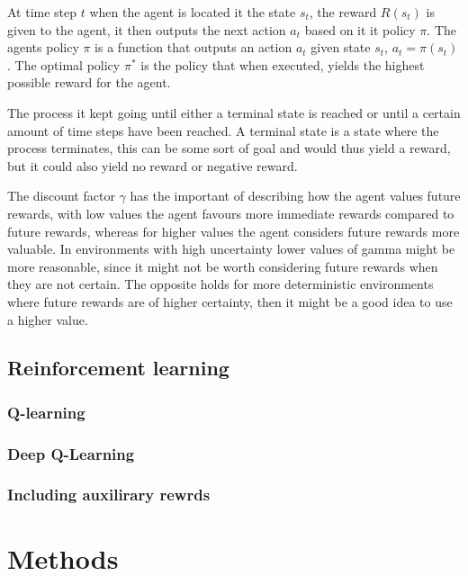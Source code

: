 \documentclass[12pt,A4]{report}
\theoremstyle{definition}
\begin{document}
At time step $t$ when the agent is located it the state $s_t$, the reward $R(s_t)$ is given to the agent, it then outputs the next action $a_t$ based on it it policy $\pi$. The agents policy $\pi$ is a function that outputs an action $a_t$ given state $s_t$, $a_t = \pi(s_t)$. The optimal policy $\pi^*$ is the policy that when executed, yields the highest possible reward for the agent. 

The process it kept going until either a terminal state is reached or until a certain amount of time steps have been reached. A terminal state is a state where the process terminates, this can be some sort of goal and would thus yield a reward, but it could also yield no reward or negative reward.

The discount factor $\gamma$ has the important of describing how the agent values future rewards, with low values the agent favours more immediate rewards compared to future rewards, whereas for higher values the agent considers future rewards more valuable. In environments with high uncertainty lower values of gamma might be more reasonable, since it might not be worth considering future rewards when they are not certain. The opposite holds for more deterministic environments where future rewards are of higher certainty, then it might be a good idea to use a higher value.


\section{Reinforcement learning}

\subsection{Q-learning}

\subsection{Deep Q-Learning}

\subsection{Including auxilirary rewrds}





\chapter{Methods}
\end{document}
